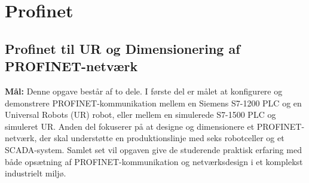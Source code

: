 \section{Profinet}
\subsection{Profinet til UR og Dimensionering af PROFINET-netværk}
\textbf{Mål:} Denne opgave består af to dele. I første del er målet at konfigurere og demonstrere PROFINET-kommunikation mellem en Siemens S7-1200 PLC og en Universal Robots (UR) robot, eller mellem en simulerede S7-1500 PLC og simuleret UR. Anden del fokuserer på at designe og dimensionere et PROFINET-netværk, der skal understøtte en produktionslinje med seks robotceller og et SCADA-system. Samlet set vil opgaven give de studerende praktisk erfaring med både opsætning af PROFINET-kommunikation og netværksdesign i et komplekst industrielt miljø.


